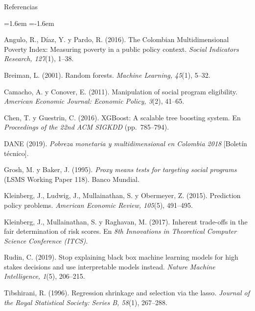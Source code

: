 \documentclass[aspectratio=169,10pt,xcolor=table]{beamer}
\begin{document}
\begin{frame}{Referencias}
\scriptsize
\begin{list}{}{\leftmargin=1.6em \itemindent=-1.6em \itemsep=1.2pt \parsep=0pt}
  \item Angulo, R., Díaz, Y. y Pardo, R. (2016). The Colombian
    Multidimensional Poverty Index: Measuring poverty in a public policy
    context. \emph{Social Indicators Research, 127}(1), 1--38.
  \item Breiman, L. (2001). Random forests. \emph{Machine Learning, 45}(1),
    5--32.
  \item Camacho, A. y Conover, E. (2011). Manipulation of social program
    eligibility. \emph{American Economic Journal: Economic Policy, 3}(2),
    41--65.
  \item Chen, T. y Guestrin, C. (2016). XGBoost: A scalable tree boosting
    system. En \emph{Proceedings of the 22nd ACM SIGKDD} (pp.\ 785--794).
  \item DANE (2019). \emph{Pobreza monetaria y multidimensional en Colombia
    2018} [Boletín técnico].
  \item Grosh, M. y Baker, J. (1995). \emph{Proxy means tests for targeting
    social programs} (LSMS Working Paper 118). Banco Mundial.
  \item Kleinberg, J., Ludwig, J., Mullainathan, S. y Obermeyer, Z. (2015).
    Prediction policy problems. \emph{American Economic Review, 105}(5),
    491--495.
  \item Kleinberg, J., Mullainathan, S. y Raghavan, M. (2017). Inherent
    trade-offs in the fair determination of risk scores. En \emph{8th
    Innovations in Theoretical Computer Science Conference (ITCS)}.
  \item Rudin, C. (2019). Stop explaining black box machine learning models
    for high stakes decisions and use interpretable models instead.
    \emph{Nature Machine Intelligence, 1}(5), 206--215.
  \item Tibshirani, R. (1996). Regression shrinkage and selection via the
    lasso. \emph{Journal of the Royal Statistical Society: Series B, 58}(1),
    267--288.
\end{list}
\end{frame}
\end{document}
